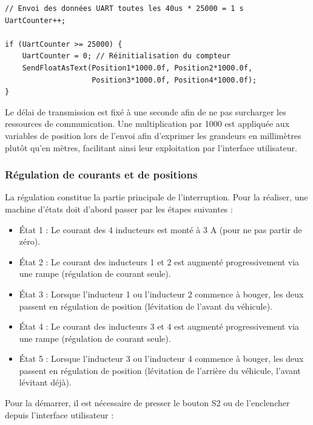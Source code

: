 \begin{verbatim}
// Envoi des données UART toutes les 40us * 25000 = 1 s
UartCounter++;

if (UartCounter >= 25000) {
    UartCounter = 0; // Réinitialisation du compteur
    SendFloatAsText(Position1*1000.0f, Position2*1000.0f,
                    Position3*1000.0f, Position4*1000.0f);
}
\end{verbatim}

Le délai de transmission est fixé à une seconde afin de ne pas surcharger les ressources de communication. Une multiplication par 1000 est appliquée aux variables de position lors de l'envoi afin d'exprimer les grandeurs en millimètres plutôt qu'en mètres, facilitant ainsi leur exploitation par l'interface utilisateur.

\subsubsection{Régulation de courants et de positions}
\label{subsubsec:RegCourantPos}
La régulation constitue la partie principale de l'interruption. Pour la réaliser, une machine d'états doit d'abord passer par les étapes suivantes :

\begin{itemize}
    \item État 1 : Le courant des 4 inducteurs est monté à 3 A (pour ne pas partir de zéro).

    \item État 2 : Le courant des inducteurs 1 et 2 est augmenté progressivement via une rampe (régulation de courant seule).

    \item État 3 : Lorsque l'inducteur 1 ou l'inducteur 2 commence à bouger, les deux passent en régulation de position (lévitation de l'avant du véhicule).

    \item État 4 : Le courant des inducteurs 3 et 4 est augmenté progressivement via une rampe (régulation de courant seule).

    \item État 5 : Lorsque l'inducteur 3 ou l'inducteur 4 commence à bouger, les deux passent en régulation de position (lévitation de l'arrière du véhicule, l'avant lévitant déjà).
\end{itemize}

Pour la démarrer, il est nécessaire de presser le bouton S2 ou de l'enclencher depuis l'interface utilisateur :


